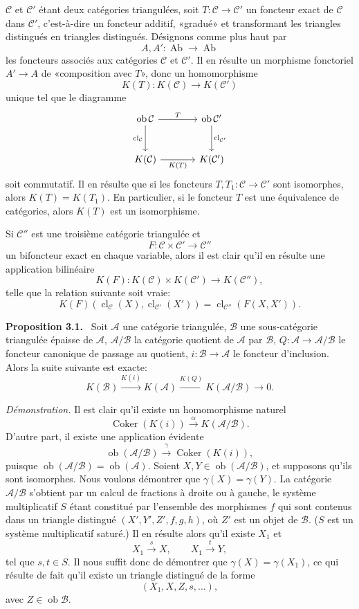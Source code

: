 \documentclass[11pt]{article}
\newenvironment{statement}[1]{\par\medskip\noindent\textbf{#1.}\ }{\par\medskip}
\providecommand{\Ob}{\operatorname{ob}}
\providecommand{\cC}{\mathcal C}
\providecommand{\Ob}{\operatorname{ob}}
\providecommand{\Ab}{\operatorname{Ab}}
\providecommand{\cC}{\mathcal C}
\providecommand{\cA}{\mathcal A}
\providecommand{\cB}{\mathcal B}
\providecommand{\Ab}{\operatorname{Ab}}
\providecommand{\Ob}{\operatorname{Ob}}
\providecommand{\Ob}{\operatorname{ob}}
\providecommand{\Ob}{\operatorname{Ob}}
\begin{document}
$\cC$ et $\cC'$ étant deux catégories triangulées, soit $T:\cC\to\cC'$ un foncteur exact de $\cC$ dans $\cC'$, c'est-à-dire un foncteur additif, «gradué» et transformant les triangles distingués en triangles distingués. Désignons comme plus haut par
\[
A,A':\Ab\longrightarrow\Ab
\]
les foncteurs associés aux catégories $\cC$ et $\cC'$. Il en résulte un morphisme fonctoriel $A'\to A$ de «composition avec $T$», donc un homomorphisme
\[
K(T):K(\cC)\longrightarrow K(\cC')
\]
unique tel que le diagramme
\[
\begin{tikzcd}[column sep=large,row sep=large]
\Ob\cC \arrow[r,"T"] \arrow[d,"\operatorname{cl}_{\cC}"']&
\Ob\cC' \arrow[d,"\operatorname{cl}_{\cC'}"]\\
K(\cC) \arrow[r,"K(T)"']& K(\cC')
\end{tikzcd}
\]
soit commutatif. Il en résulte que si les foncteurs $T,T_1:\cC\to\cC'$ sont isomorphes, alors $K(T)=K(T_1)$. En particulier, si le foncteur $T$ est une équivalence de catégories, alors $K(T)$ est un isomorphisme.

Si $\cC''$ est une troisième catégorie triangulée et
\[
F:\cC\times\cC'\longrightarrow \cC''
\]
un bifoncteur exact en chaque variable, alors il est clair qu'il en résulte une application bilinéaire
\[
K(F):K(\cC)\times K(\cC')\longrightarrow K(\cC''),
\]
telle que la relation suivante soit vraie:
\[
K(F)(\operatorname{cl}_{\cC}(X),\operatorname{cl}_{\cC'}(X'))
=
\operatorname{cl}_{\cC''}(F(X,X')).
\]

\begin{statement}{Proposition 3.1}
Soit $\cA$ une catégorie triangulée, $\cB$ une sous-catégorie triangulée épaisse de $\cA$, $\cA/\cB$ la catégorie quotient de $\cA$ par $\cB$, $Q:\cA\to\cA/\cB$ le foncteur canonique de passage au quotient, $i:\cB\to\cA$ le foncteur d'inclusion. Alors la suite suivante est exacte:
\[
K(\cB)\xrightarrow{K(i)}K(\cA)\xrightarrow{K(Q)}K(\cA/\cB)\longrightarrow 0.
\]
\end{statement}

\emph{Démonstration.} Il est clair qu'il existe un homomorphisme naturel
\[
\operatorname{Coker}(K(i))\xrightarrow{\alpha}K(\cA/\cB).
\]
D'autre part, il existe une application évidente
\[
\Ob(\cA/\cB)\xrightarrow{\gamma}\operatorname{Coker}(K(i)),
\]
puisque $\Ob(\cA/\cB)=\Ob(\cA)$. Soient $X,Y\in\Ob(\cA/\cB)$, et supposons qu'ils sont isomorphes. Nous voulons démontrer que $\gamma(X)=\gamma(Y)$. La catégorie $\cA/\cB$ s'obtient par un calcul de fractions à droite ou à gauche, le système multiplicatif $S$ étant constitué par l'ensemble des morphismes $f$ qui sont contenus dans un triangle distingué $(X',Y',Z',f,g,h)$, où $Z'$ est un objet de $\cB$. ($S$ est un système multiplicatif saturé.) Il en résulte alors qu'il existe $X_1$ et
\[
X_1\xrightarrow{s}X,\qquad X_1\xrightarrow{t}Y,
\]
tel que $s,t\in S$. Il nous suffit donc de démontrer que $\gamma(X)=\gamma(X_1)$, ce qui résulte de fait qu'il existe un triangle distingué de la forme
\[
(X_1,X,Z,s,\ldots),
\]
avec $Z\in\Ob\cB$.
\end{document}

